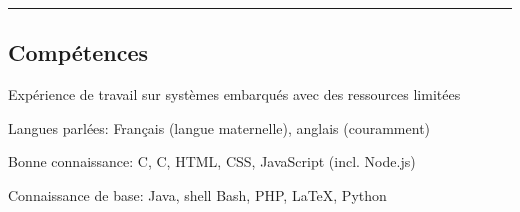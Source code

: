 \documentclass[11pt,a4paper]{article}
\newenvironment{indentsection}[1]%
{\begin{list}{}%
	{\setlength{\leftmargin}{#1}}%
	\item[]%
}
{\end{list}}
\newcommand{\Cplusplus}
{C\nolinebreak[4]\hspace{-.05em}\raisebox{.22ex}{\footnotesize\bf ++}}
\begin{document}
\hrule
\vspace{-0.4em}
\subsection*{Compétences}

\begin{indentsection}{\parindent}
\begin{description*}
	\item[Expérience de travail sur systèmes embarqués avec des ressources limitées]
	\item[Langues parlées:]
	Français (langue maternelle), anglais (couramment)
	\item[Bonne connaissance:]
	C, \Cplusplus, HTML, CSS, JavaScript (incl. Node.js)
	\item[Connaissance de base:]
	Java, shell Bash, PHP, \LaTeX, Python
\end{description*}
\end{indentsection}
\end{document}
